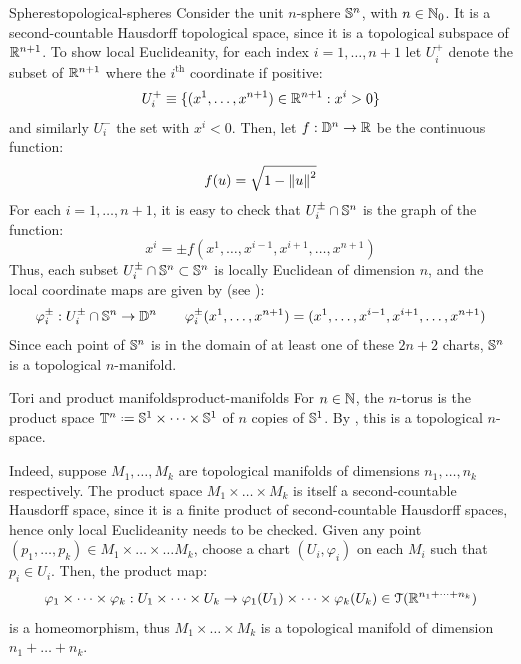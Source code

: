\begin{example}{Spheres}{topological-spheres}
  Consider the unit $ n $-sphere $ \mathbb{S}^{n} $, with $ n \in \mathbb{N}_0 $. It is a second-countable Hausdorff topological space, since it is a topological subspace of $ \mathbb{R}^{n+1} $. To show local Euclideanity, for each index $ i = 1, \dots, n+1 $ let $ U_i^+ $ denote the subset of $ \mathbb{R}^{n+1} $ where the $ i^\text{th} $ coordinate if positive:
  \begin{equation*}
    U_i^+ \equiv \{(x^1 , \dots , x^{n+1}) \in \mathbb{R}^{n+1} : x^i > 0\}
  \end{equation*}
  and similarly $ U_i^- $ the set with $ x^i < 0 $. Then, let $ f : \mathbb{D}^{n} \rightarrow \mathbb{R} $ be the continuous function:
  \begin{equation*}
    f(u) = \sqrt{1 - \left\lVert u\right\rVert^2}
  \end{equation*}
  For each $ i = 1 , \dots , n+1 $, it is easy to check that $ U_i^\pm \cap \mathbb{S}^{n} $ is the graph of the function:
  \begin{equation*}
    x^i = \pm f(x^1 , \dots , x^{i-1} , x^{i+1} , \dots , x^{n+1})
  \end{equation*}
  Thus, each subset $ U_i^\pm \cap \mathbb{S}^{n} \subset \mathbb{S}^{n} $ is locally Euclidean of dimension $ n $, and the local coordinate maps are given by (see ):
  \begin{equation*}
    \varphi_i^\pm : U_i^\pm \cap \mathbb{S}^{n} \rightarrow \mathbb{D}^{n}
    \qquad
    \varphi_i^\pm(x^1 , \dots , x^{n+1}) = (x^1 , \dots , x^{i-1} , x^{i+1} , \dots , x^{n+1})
  \end{equation*}
  Since each point of $ \mathbb{S}^{n} $ is in the domain of at least one of these $ 2n+2 $ charts, $ \mathbb{S}^{n} $ is a topological $ n $-manifold.
\end{example}

\begin{example}{Tori and product manifolds}{product-manifolds}
  For $ n \in \mathbb{N} $, the $ n $-torus is the product space $ \Tn{n} \defeq \Sn{1} \times \dots \times \Sn{1} $ of $ n $ copies of $ \mathbb{S}^{1} $. By , this is a topological $ n $-space.

  Indeed, suppose $ M_1 , \dots , M_k $ are topological manifolds of dimensions $ n_1 , \dots , n_k $ respectively. The product space $ M_1 \times \dots \times M_k $ is itself a second-countable Hausdorff space, since it is a finite product of second-countable Hausdorff spaces, hence only local Euclideanity needs to be checked. Given any point $ (p_1 , \dots , p_k) \in M_1 \times \dots \times \dots M_k $, choose a chart $ (U_i , \varphi_i) $ on each $ M_i $ such that $ p_i \in U_i $. Then, the product map:
  \begin{equation*}
    \varphi_1 \times \dots \times \varphi_k : U_1 \times \dots \times U_k \rightarrow \varphi_1(U_1) \times \dots \times \varphi_k(U_k) \in \EuScript{T}(\mathbb{R}^{n_1 + \dots + n_k})
  \end{equation*}
  is a homeomorphism, thus $ M_1 \times \dots \times M_k $ is a topological manifold of dimension $ n_1 + \dots + n_k $.
\end{example}

